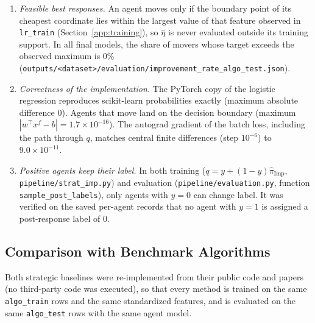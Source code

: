 \begin{enumerate}
  \texttt{outputs/synthetic/evaluation/true\_eta\_validation\_algo\_test.json}).
  The expected improvement rate is $0.8740$ with $\widehat{\eta}$ versus
  $0.8733$ with $\eta$, and the expected strategic improvement error is $0.0628$
  versus $0.0630$.
  \item \emph{Feasible best responses.} An agent moves only if the boundary
  point of its cheapest coordinate lies within the largest value of that
  feature observed in \texttt{lr\_train} (Section~\ref{app:training}), so
  $\widehat{\eta}$ is never evaluated outside its training support. In all
  final models, the share of movers whose target exceeds the observed maximum
  is $0\%$ (\texttt{outputs/<dataset>/evaluation/improvement\_rate\_algo\_test.json}).
  \item \emph{Correctness of the implementation.} The PyTorch copy of the
  logistic regression reproduces scikit-learn probabilities exactly (maximum
  absolute difference $0$). Agents that move land on the decision boundary
  (maximum $|w^\top x^f-b|=1.7\times10^{-16}$). The autograd gradient of the
  batch loss, including the path through $q$, matches central finite differences
  (step $10^{-6}$) to $9.0\times10^{-11}$.
  \item \emph{Positive agents keep their label.} In both training
  ($q=y+(1-y)\widehat{\pi}_{\mathrm{Imp}}$, \texttt{pipeline/strat\_imp.py})
  and evaluation (\texttt{pipeline/evaluation.py}, function
  \texttt{sample\_post\_labels}), only agents with $y=0$ can change label. It
  was verified on the saved per-agent records that no agent with $y=1$ is
  assigned a post-response label of $0$.
\end{enumerate}

\subsection{Comparison with Benchmark Algorithms}
\label{app:baselines}

Both strategic baselines were re-implemented from their public code and
papers (no third-party code was executed), so that every method is trained on
the same \texttt{algo\_train} rows and the same standardized features, and is
evaluated on the same \texttt{algo\_test} rows with the same agent model.

